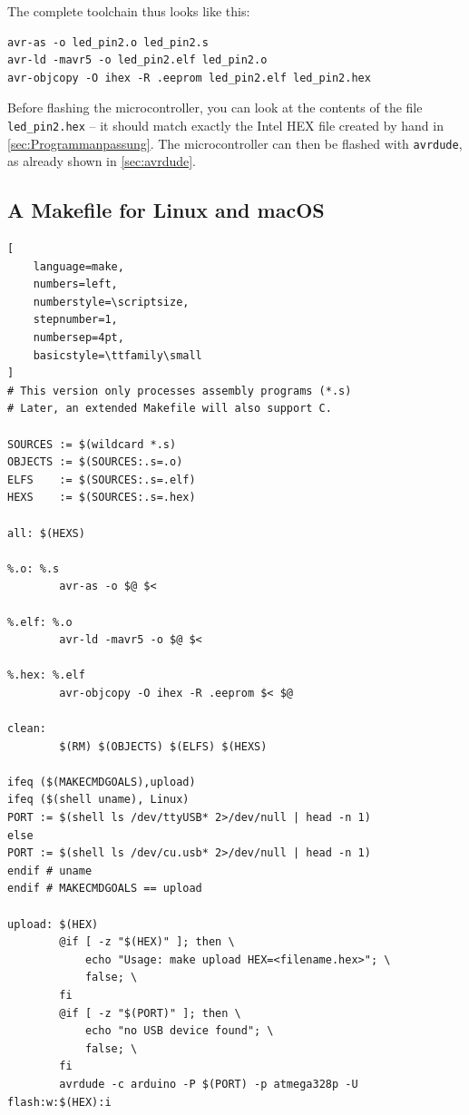 \documentclass[a4paper,12pt]{article}
\begin{document}
\noindent The complete toolchain thus looks like this:

\begin{lstlisting}
avr-as -o led_pin2.o led_pin2.s
avr-ld -mavr5 -o led_pin2.elf led_pin2.o
avr-objcopy -O ihex -R .eeprom led_pin2.elf led_pin2.hex
\end{lstlisting}

\noindent
Before flashing the microcontroller, you can look at the contents of the file
\texttt{led\_pin2.hex} – it should match exactly the Intel HEX file created
by hand in \autoref{sec:Programmanpassung}. The microcontroller can then be
flashed with \texttt{avrdude}, as already shown in \autoref{sec:avrdude}.

\vspace{15bp}
\subsection{A Makefile for Linux and macOS}


\begin{listing}[htbp]
\centering
\caption{
    File \texttt{Makefile} for translating assembly programs on Linux and
    macOS. This version processes \texttt{.s} files only.
}
\label{lst:Makefile_asm}
\vspace{1em}
\begin{minipage}{0.95\textwidth}
\begin{lstlisting}[
    language=make,
    numbers=left,
    numberstyle=\scriptsize,
    stepnumber=1,
    numbersep=4pt,
    basicstyle=\ttfamily\small
]
# This version only processes assembly programs (*.s)
# Later, an extended Makefile will also support C.

SOURCES := $(wildcard *.s)
OBJECTS := $(SOURCES:.s=.o)
ELFS    := $(SOURCES:.s=.elf)
HEXS    := $(SOURCES:.s=.hex)

all: $(HEXS)

%.o: %.s
        avr-as -o $@ $<

%.elf: %.o
        avr-ld -mavr5 -o $@ $<

%.hex: %.elf
        avr-objcopy -O ihex -R .eeprom $< $@

clean:
        $(RM) $(OBJECTS) $(ELFS) $(HEXS)

ifeq ($(MAKECMDGOALS),upload)
ifeq ($(shell uname), Linux)
PORT := $(shell ls /dev/ttyUSB* 2>/dev/null | head -n 1)
else
PORT := $(shell ls /dev/cu.usb* 2>/dev/null | head -n 1)
endif # uname
endif # MAKECMDGOALS == upload

upload: $(HEX)
        @if [ -z "$(HEX)" ]; then \
            echo "Usage: make upload HEX=<filename.hex>"; \
            false; \
        fi
        @if [ -z "$(PORT)" ]; then \
            echo "no USB device found"; \
            false; \
        fi
        avrdude -c arduino -P $(PORT) -p atmega328p -U flash:w:$(HEX):i
\end{lstlisting}
\end{minipage}
\end{listing}
\end{document}
